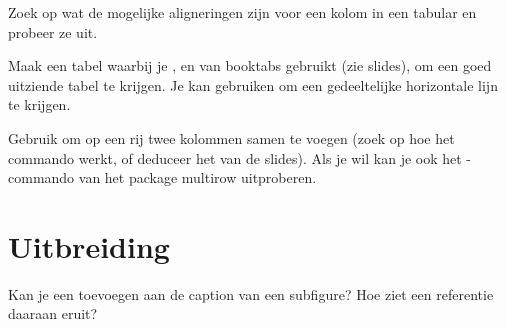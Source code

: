 \documentclass[a4paper]{article}
\begin{document}
    \begin{exercise}[Alignering]
        Zoek op wat de mogelijke aligneringen zijn voor een kolom in een tabular
        en probeer ze uit.
    \end{exercise}

    \begin{exercise}[Booktabs]
        Maak een tabel waarbij je \texttt{\toprule}, \texttt{\midrule}
        en \texttt{\bottom} van booktabs gebruikt (zie slides), om
        een goed uitziende tabel te krijgen. Je kan \texttt{\cmidrule} gebruiken om een
        gedeeltelijke horizontale lijn te krijgen.
    \end{exercise}

    \begin{exercise}[Excellent]
        Gebruik \texttt{\multicolumn} om op een rij twee kolommen samen te voegen
        (zoek op hoe het commando werkt, of deduceer het van de slides). Als je
        wil kan je ook het \texttt{\multirow}-commando van het package multirow
        uitproberen.
    \end{exercise}



    \section{Uitbreiding}

    \begin{exercise}[tabularx]
        
    \end{exercise}

    \begin{exercise}
        Kan je een \texttt{\label{...}} toevoegen aan de caption van een subfigure?
        Hoe ziet een referentie daaraan eruit?
    \end{exercise}
\end{document}

